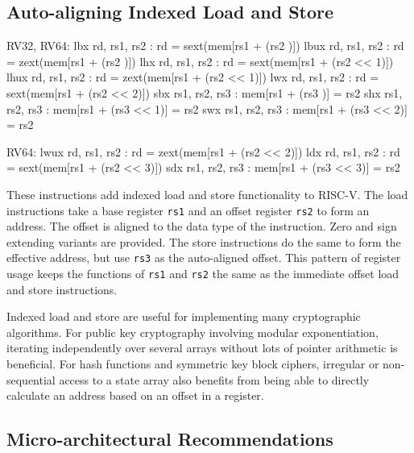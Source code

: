\subsection{Auto-aligning Indexed Load and Store}
\label{sec:ildst}

\begin{cryptoisa}
RV32, RV64:
    lbx     rd,  rs1, rs2 : rd = sext(mem[rs1 + (rs2     )])
    lbux    rd,  rs1, rs2 : rd = zext(mem[rs1 + (rs2     )])
    lhx     rd,  rs1, rs2 : rd = sext(mem[rs1 + (rs2 << 1)])
    lhux    rd,  rs1, rs2 : rd = zext(mem[rs1 + (rs2 << 1)])
    lwx     rd,  rs1, rs2 : rd = sext(mem[rs1 + (rs2 << 2)])
    sbx     rs1, rs2, rs3 : mem[rs1 + (rs3     )] = rs2
    shx     rs1, rs2, rs3 : mem[rs1 + (rs3 << 1)] = rs2
    swx     rs1, rs2, rs3 : mem[rs1 + (rs3 << 2)] = rs2

RV64:
    lwux    rd,  rs1, rs2 : rd = zext(mem[rs1 + (rs2 << 2)])
    ldx     rd,  rs1, rs2 : rd = sext(mem[rs1 + (rs2 << 3)])
    sdx     rs1, rs2, rs3 : mem[rs1 + (rs3 << 3)] = rs2
\end{cryptoisa}


These instructions add indexed load and store functionality to RISC-V.
The load instructions take a base register {\tt rs1} and an offset
register {\tt rs2} to form an address.
The offset is aligned to the data type of the instruction.
Zero and sign extending variants are provided.
The store instructions do the same to form the effective address, but
use {\tt rs3} as the auto-aligned offset.
This pattern of register usage keeps the functions of {\tt rs1} and
{\tt rs2} the same as the immediate offset load and store instructions.

Indexed load and store are useful for implementing many cryptographic
algorithms.
For public key cryptography involving modular exponentiation, iterating
independently over several arrays without lots of pointer arithmetic
is beneficial.
For hash functions and symmetric key block ciphers, irregular or
non-sequential access to a state array also benefits from
being able to directly calculate an address based on an offset in a
register.


\subsection{Micro-architectural Recommendations}



